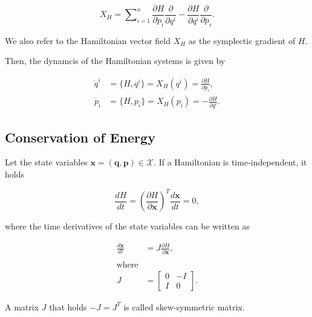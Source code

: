 \documentclass[
	parskip, 			   %
	twoside, 			   %
	DIV=14, 			   %
	BCOR=15.0mm, 		   %
	headsepline, 		   %
	open=right, 		   %
	captions=tableheading, %
	bibliography=totoc,    %
	numbers=noenddot       %
]{scrreprt}
\begin{document}
\begin{equation}
    \label{eq:Hamiltonian_vector_field}
    X_H = \sum\nolimits_{i=1}^n \frac{\partial H}{\partial p_i} \frac{\partial}{\partial q^i} - \frac{\partial H}{\partial q^i} \frac{\partial}{\partial p_i}.
\end{equation}

We also refer to the Hamiltonian vector field $X_H$ as the symplectic gradient of $H$.

Then, the dynamcis of the Hamiltonian systems is given by 

\begin{equation}
    \label{eq:Hamiltonian_dynamcis}
    \begin{aligned}
    \dot{q}^i &= \{H, q^i\} = X_H(q^i)=\frac{\partial H}{\partial p_i},\\
    \dot{p}_i &= \{H, p_i\}= X_H(p_i)=-\frac{\partial H}{\partial q^i}.
    \end{aligned}
\end{equation}


\subsection{Conservation of Energy}
Let the state variables $\mathbf{x}=(\mathbf{q},\mathbf{p}) \in \mathcal{X}$. If a Hamiltonian is time-independent, it holds

\begin{equation}
    \label{eq:Hamiltonian_invariant}
    \frac{dH}{dt} = (\frac{\partial H}{\partial \mathbf{x}})^T \frac{d\mathbf{x}}{dt} = 0,
\end{equation}

where the time derivatives of the state variables can be written as

\begin{equation}
    \label{eq:Hamiltonian_symplectic}
    \begin{aligned}
        \frac{d\mathbf{x}}{dt} &= J \frac{\partial H}{\partial \mathbf{x}},\\\\
        \text{where}\\
        J &= \left[ \begin{array}{cc}
            0 & -I \\
            I & 0
        \end{array} \right].
    \end{aligned}
\end{equation}

A matrix $J$ that holds $-J = J^T$ is called skew-symmetric matrix.
\end{document}

